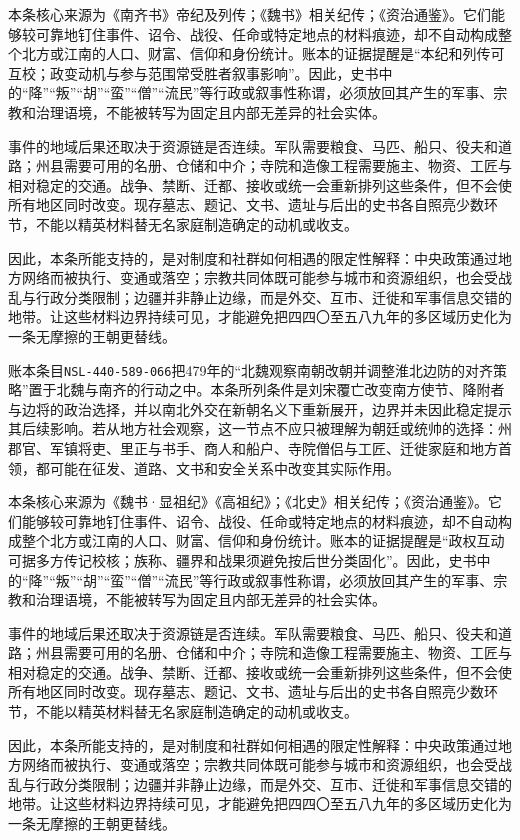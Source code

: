 本条核心来源为《南齐书》帝纪及列传；《魏书》相关纪传；《资治通鉴》。它们能够较可靠地钉住事件、诏令、战役、任命或特定地点的材料痕迹，却不自动构成整个北方或江南的人口、财富、信仰和身份统计。账本的证据提醒是“本纪和列传可互校；政变动机与参与范围常受胜者叙事影响”。因此，史书中的“降”“叛”“胡”“蛮”“僧”“流民”等行政或叙事性称谓，必须放回其产生的军事、宗教和治理语境，不能被转写为固定且内部无差异的社会实体。

事件的地域后果还取决于资源链是否连续。军队需要粮食、马匹、船只、役夫和道路；州县需要可用的名册、仓储和中介；寺院和造像工程需要施主、物资、工匠与相对稳定的交通。战争、禁断、迁都、接收或统一会重新排列这些条件，但不会使所有地区同时改变。现存墓志、题记、文书、遗址与后出的史书各自照亮少数环节，不能以精英材料替无名家庭制造确定的动机或收支。

因此，本条所能支持的，是对制度和社群如何相遇的限定性解释：中央政策通过地方网络而被执行、变通或落空；宗教共同体既可能参与城市和资源组织，也会受战乱与行政分类限制；边疆并非静止边缘，而是外交、互市、迁徙和军事信息交错的地带。让这些材料边界持续可见，才能避免把四四〇至五八九年的多区域历史化为一条无摩擦的王朝更替线。

账本条目\texttt{NSL-440-589-066}把479年的“北魏观察南朝改朝并调整淮北边防的对齐策略”置于北魏与南齐的行动之中。本条所列条件是刘宋覆亡改变南方使节、降附者与边将的政治选择，并以南北外交在新朝名义下重新展开，边界并未因此稳定提示其后续影响。若从地方社会观察，这一节点不应只被理解为朝廷或统帅的选择：州郡官、军镇将吏、里正与书手、商人和船户、寺院僧侣与工匠、迁徙家庭和地方首领，都可能在征发、道路、文书和安全关系中改变其实际作用。

本条核心来源为《魏书·显祖纪》《高祖纪》；《北史》相关纪传；《资治通鉴》。它们能够较可靠地钉住事件、诏令、战役、任命或特定地点的材料痕迹，却不自动构成整个北方或江南的人口、财富、信仰和身份统计。账本的证据提醒是“政权互动可据多方传记校核；族称、疆界和战果须避免按后世分类固化”。因此，史书中的“降”“叛”“胡”“蛮”“僧”“流民”等行政或叙事性称谓，必须放回其产生的军事、宗教和治理语境，不能被转写为固定且内部无差异的社会实体。

事件的地域后果还取决于资源链是否连续。军队需要粮食、马匹、船只、役夫和道路；州县需要可用的名册、仓储和中介；寺院和造像工程需要施主、物资、工匠与相对稳定的交通。战争、禁断、迁都、接收或统一会重新排列这些条件，但不会使所有地区同时改变。现存墓志、题记、文书、遗址与后出的史书各自照亮少数环节，不能以精英材料替无名家庭制造确定的动机或收支。

因此，本条所能支持的，是对制度和社群如何相遇的限定性解释：中央政策通过地方网络而被执行、变通或落空；宗教共同体既可能参与城市和资源组织，也会受战乱与行政分类限制；边疆并非静止边缘，而是外交、互市、迁徙和军事信息交错的地带。让这些材料边界持续可见，才能避免把四四〇至五八九年的多区域历史化为一条无摩擦的王朝更替线。

